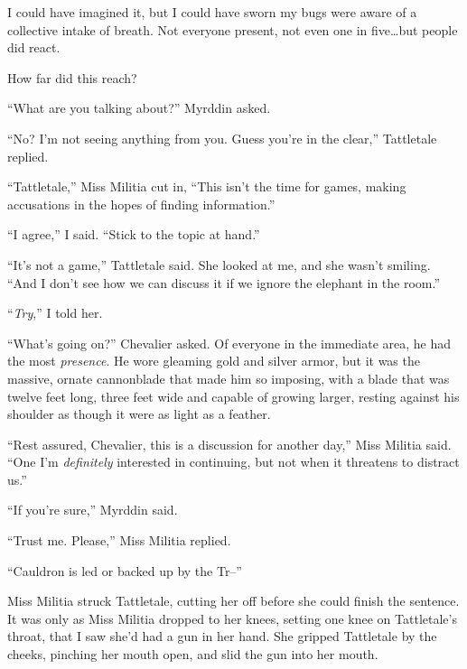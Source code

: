 I could have imagined it, but I could have sworn my bugs were aware of a collective intake of breath.  Not everyone present, not even one in five\ldots but people did react.



How far did this reach?



``What are you talking about?''  Myrddin asked.



``No?  I'm not seeing anything from you.  Guess you're in the clear,'' Tattletale replied.



``Tattletale,'' Miss Militia cut in, ``This isn't the time for games, making accusations in the hopes of finding information.''



``I agree,'' I said.  ``Stick to the topic at hand.''



``It's not a game,'' Tattletale said.  She looked at me, and she wasn't smiling.  ``And I don't see how we can discuss it if we ignore the elephant in the room.''



``\emph{Try},'' I told her.



``What's going on?'' Chevalier asked.  Of everyone in the immediate area, he had the most \emph{presence}.  He wore gleaming gold and silver armor, but it was the massive, ornate cannonblade that made him so imposing, with a blade that was twelve feet long, three feet wide and capable of growing larger, resting against his shoulder as though it were as light as a feather.



``Rest assured, Chevalier, this is a discussion for another day,'' Miss Militia said.  ``One I'm \emph{definitely} interested in continuing, but not when it threatens to distract us.''



``If you're sure,'' Myrddin said.



``Trust me.  Please,'' Miss Militia replied.



``Cauldron is led or backed up by the Tr--''



Miss Militia struck Tattletale, cutting her off before she could finish the sentence.  It was only as Miss Militia dropped to her knees, setting one knee on Tattletale's throat, that I saw she'd had a gun in her hand.  She gripped Tattletale by the cheeks, pinching her mouth open, and slid the gun into her mouth.



